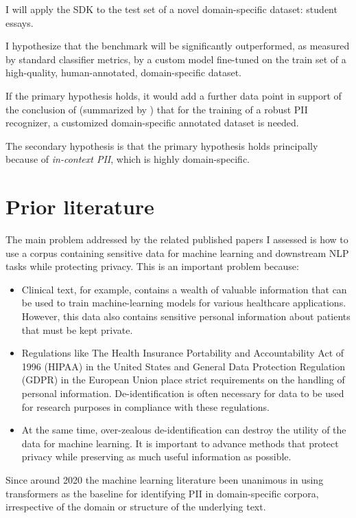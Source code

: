 \documentclass[11pt]{article}
\begin{document}
I will apply the SDK to the test set of a novel domain-specific dataset: student essays.

I hypothesize that the benchmark will be significantly outperformed, as measured by standard classifier metrics, by a custom model fine-tuned on the train set of a high-quality, human-annotated, domain-specific dataset.

If the primary hypothesis holds, it would add a further data point in support of the conclusion of \citealt{Chen2015ASO} (summarized by \citealt{hathurusinghe-etal-2021-privacy}) that for the training of a robust PII recognizer, a customized domain-specific annotated dataset is needed.

The secondary hypothesis is that the primary hypothesis holds principally because of \textit{in-context PII}, which is highly domain-specific.

\section{Prior literature}

The main problem addressed by the related published papers I assessed is how to use a corpus containing sensitive data for machine learning and downstream NLP tasks while protecting privacy. This is an important problem because:

\begin{itemize}
\item Clinical text, for example, contains a wealth of valuable information that can be used to train machine-learning models for various healthcare applications. However, this data also contains sensitive personal information about patients that must be kept private.
\item Regulations like The Health Insurance Portability and Accountability Act of 1996 (HIPAA) in the United States and General Data Protection Regulation (GDPR) in the European Union place strict requirements on the handling of personal information. De-identification is often necessary for data to be used for research purposes in compliance with these regulations.
\item At the same time, over-zealous de-identification can destroy the utility of the data for machine learning. It is important to advance methods that protect privacy while preserving as much useful information as possible.
\end{itemize}

Since around 2020 the machine learning literature been unanimous in using transformers as the baseline for identifying PII in domain-specific corpora, irrespective of the domain or structure of the underlying text.
\end{document}
